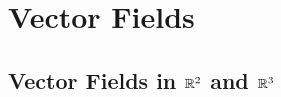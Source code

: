 \documentclass[./Calculus \Roman{3}.tex]{subfiles}
\begin{document}
	\section{Vector Fields}
		\subsection*{Vector Fields in $\mathbb{R}^2$ and $\mathbb{R}^3$}
		
\end{document}
